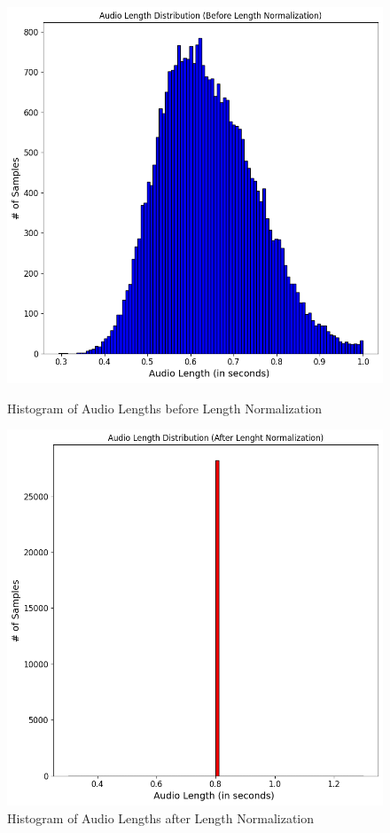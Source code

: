 \documentclass[12pt]{article}
\begin{document}
\begin{figure}[htbp]
    \centering
    \begin{minipage}[b]{0.45\linewidth}
        \centering
        \includegraphics[width=\linewidth]{figures/sample before normalization.png}
        \caption{Histogram of Audio Lengths before Length Normalization}
        \label{fig:high_freedom}
    \end{minipage}
    \hfill
    \begin{minipage}[b]{0.45\linewidth}
        \centering
        \includegraphics[width=\linewidth]{figures/sample after normalization.png}
        \caption{Histogram of Audio Lengths after Length Normalization}
        \label{fig:least_freedom}
    \end{minipage}
\end{figure}
\end{document}
